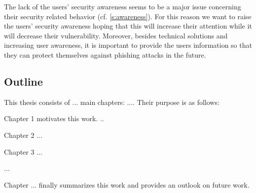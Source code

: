 The lack of the users' security awareness seems to be a major issue concerning their security related behavior (cf. \autoref{s:awareness}).
 For this reason we want to raise the users' security awareness hoping that this will increase their attention while it will decrease their vulnerability.
 Moreover, besides technical solutions and increasing user awareness, it is important to provide the users information so that they can protect themselves against phishing attacks in the future.

\subsection{Outline}


This thesis consists of ... main chapters: .... Their purpose is as follows:

Chapter 1 motivates this work.
..

Chapter 2 ...

Chapter 3 ...

...

Chapter ... finally summarizes this work and provides an outlook on future work.






